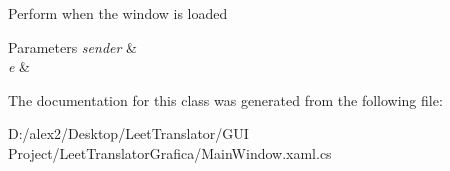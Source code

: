 Perform when the window is loaded 


\begin{DoxyParams}{Parameters}
{\em sender} & \\
\hline
{\em e} & \\
\hline
\end{DoxyParams}


The documentation for this class was generated from the following file\+:\begin{DoxyCompactItemize}
\item 
D\+:/alex2/\+Desktop/\+Leet\+Translator/\+G\+U\+I Project/\+Leet\+Translator\+Grafica/Main\+Window.\+xaml.\+cs\end{DoxyCompactItemize}
